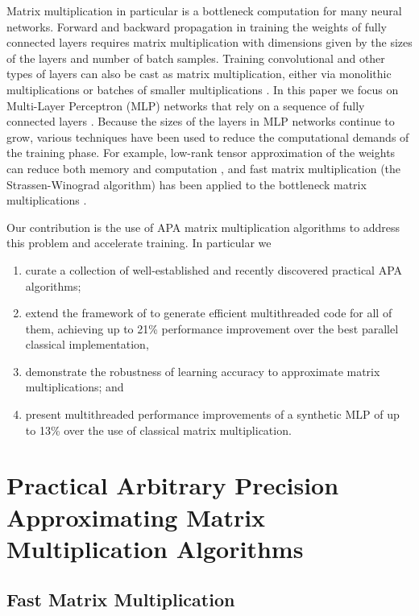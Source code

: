 \documentclass[conference]{IEEEtran}
\begin{document}
Matrix multiplication in particular is a bottleneck computation for many neural networks.
Forward and backward propagation in training the weights of fully connected layers requires matrix multiplication with dimensions given by the sizes of the layers and number of batch samples.
Training convolutional and other types of layers can also be cast as matrix multiplication, either via monolithic multiplications or batches of smaller multiplications \cite{CW+14,GB+19}.
In this paper we focus on Multi-Layer Perceptron (MLP) networks that rely on a sequence of fully connected layers \cite{HSW89}.
Because the sizes of the layers in MLP networks continue to grow, various techniques have been used to reduce the computational demands of the training phase.
For example, low-rank tensor approximation of the weights can reduce both memory and computation \cite{NPOV15}, and fast matrix multiplication (the Strassen-Winograd algorithm) has been applied to the bottleneck matrix multiplications \cite{KAA20}.

Our contribution is the use of APA matrix multiplication algorithms to address this problem and accelerate training.
In particular we
\begin{enumerate}
	\item curate a collection of well-established and recently discovered practical APA algorithms;
	\item extend the framework of \cite{BB15} to generate efficient multithreaded code for all of them, achieving up to 21\% performance improvement over the best parallel classical implementation,
	\item demonstrate the robustness of learning accuracy to approximate matrix multiplications; and
	\item present multithreaded performance improvements of a synthetic MLP of up to 13\% over the use of classical matrix multiplication.
\end{enumerate}

\section{Practical Arbitrary Precision Approximating Matrix Multiplication Algorithms}
\label{sec:APA}

\subsection{Fast Matrix Multiplication}
\end{document}
